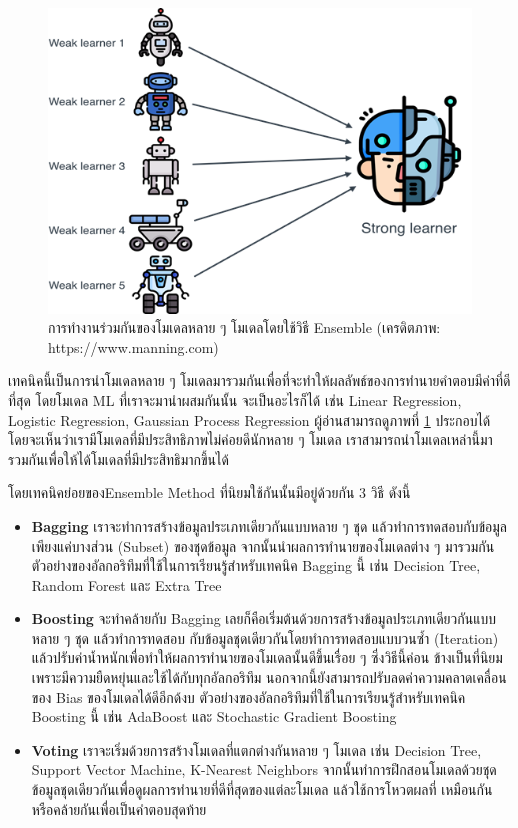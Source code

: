 \begin{figure}[htbp]
    \centering
    \includegraphics[width=0.9\linewidth]{fig/ensemble_method.png}
    \caption{การทำงานร่วมกันของโมเดลหลาย ๆ โมเดลโดยใช้วิธี Ensemble (เครดิตภาพ: https://www.manning.com)}
    \label{fig:ensemble_method}
\end{figure}

เทคนิคนี้เป็นการนำโมเดลหลาย ๆ โมเดลมารวมกันเพื่อที่จะทำให้ผลลัพธ์ของการทำนายคำตอบมีค่าที่ดีที่สุด โดยโมเดล ML ที่เราจะมานำผสมกันนั้น%
จะเป็นอะไรก็ได้ เช่น Linear Regression, Logistic Regression, Gaussian Process Regression ผู้อ่านสามารถดูภาพที่ 
\ref{fig:ensemble_method} ประกอบได้ โดยจะเห็นว่าเรามีโมเดลที่มีประสิทธิภาพไม่ค่อยดีนักหลาย ๆ โมเดล เราสามารถนำโมเดลเหล่านี้มา%
รวมกันเพื่อให้ได้โมเดลที่มีประสิทธิมากขึ้นได้

โดยเทคนิคย่อยของEnsemble Method ที่นิยมใช้กันนั้นมีอยู่ด้วยกัน 3 วิธี ดังนี้

\begin{itemize}[topsep=0pt]
    \item \textbf{Bagging} เราจะทำการสร้างข้อมูลประเภทเดียวกันแบบหลาย ๆ ชุด แล้วทำการทดสอบกับข้อมูลเพียงแค่บางส่วน (Subset) 
    ของชุดข้อมูล จากนั้นนำผลการทำนายของโมเดลต่าง ๆ มารวมกัน ตัวอย่างของอัลกอริทึมที่ใช้ในการเรียนรู้สำหรับเทคนิค Bagging นี้ เช่น 
    Decision Tree, Random Forest และ Extra Tree

    \item \textbf{Boosting} จะทำคล้ายกับ Bagging เลยก็คือเริ่มต้นด้วยการสร้างข้อมูลประเภทเดียวกันแบบหลาย ๆ ชุด แล้วทำการทดสอบ%
    กับข้อมูลชุดเดียวกันโดยทำการทดสอบแบบวนซ้ำ (Iteration) แล้วปรับค่าน้ำหนักเพื่อทำให้ผลการทำนายของโมเดลนั้นดีขึ้นเรื่อย ๆ ซึ่งวิธีนี้ค่อน%
    ข้างเป็นที่นิยมเพราะมีความยืดหยุ่นและใช้ได้กับทุกอัลกอริทึม นอกจากนี้ยังสามารถปรับลดค่าความคลาดเคลื่อนของ Bias ของโมเดลได้ดีอีกด้งบ 
    ตัวอย่างของอัลกอริทึมที่ใช้ในการเรียนรู้สำหรับเทคนิค Boosting นี้ เช่น AdaBoost และ Stochastic Gradient Boosting

    \item \textbf{Voting} เราจะเริ่มด้วยการสร้างโมเดลที่แตกต่างกันหลาย ๆ โมเดล เช่น Decision Tree, Support Vector Machine, 
    K-Nearest Neighbors จากนั้นทำการฝึกสอนโมเดลด้วยชุดข้อมูลชุดเดียวกันเพื่อดูผลการทำนายที่ดีที่สุดของแต่ละโมเดล แล้วใช้การโหวตผลที่%
    เหมือนกันหรือคล้ายกันเพื่อเป็นคำตอบสุดท้าย
\end{itemize}

